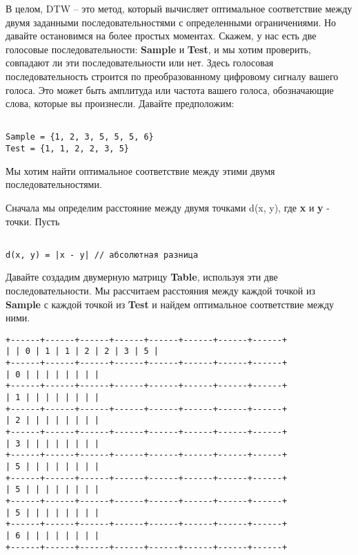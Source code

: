 \vspace{\baselineskip}
В целом, DTW – это метод, который вычисляет оптимальное соответствие между двумя заданными последовательностями с определенными ограничениями. Но давайте остановимся на более простых моментах. Скажем, у нас есть две голосовые последовательности: \textbf{Sample} и \textbf{Test}, и мы хотим проверить, совпадают ли эти последовательности или нет. Здесь голосовая последовательность строится по преобразованному цифровому сигналу вашего голоса. Это может быть амплитуда или частота вашего голоса, обозначающие слова, которые вы произнесли. Давайте предположим:


\vspace{\baselineskip}
\begin{tcolorbox}
\begin{verbatim}

Sample = {1, 2, 3, 5, 5, 5, 6}
Test = {1, 1, 2, 2, 3, 5}

\end{verbatim}
\end{tcolorbox}

\vspace{\baselineskip}
Мы хотим найти оптимальное соответствие между этими двумя последовательностями.

Сначала мы определим расстояние между двумя точками d(x, y), где \textbf{x} и \textbf{y} - точки. Пусть

\vspace{\baselineskip}
\begin{tcolorbox}
\begin{verbatim}

d(x, y) = |x - y| // абсолютная разница

\end{verbatim}
\end{tcolorbox}

\vspace{\baselineskip}
\vspace{-0.2cm}
Давайте создадим двумерную матрицу \textbf{Table}, используя эти две последовательности. Мы рассчитаем расстояния между каждой точкой из \textbf{Sample} с каждой точкой из \textbf{Test} и найдем оптимальное соответствие между ними.

\newpage
\begin{tcolorbox}
\begin{verbatim}
+------+------+------+------+------+------+------+------+
| | 0 | 1 | 1 | 2 | 2 | 3 | 5 |
+------+------+------+------+------+------+------+------+
| 0 | | | | | | | |
+------+------+------+------+------+------+------+------+
| 1 | | | | | | | |
+------+------+------+------+------+------+------+------+
| 2 | | | | | | | |
+------+------+------+------+------+------+------+------+
| 3 | | | | | | | |
+------+------+------+------+------+------+------+------+
| 5 | | | | | | | |
+------+------+------+------+------+------+------+------+
| 5 | | | | | | | |
+------+------+------+------+------+------+------+------+
| 5 | | | | | | | |
+------+------+------+------+------+------+------+------+
| 6 | | | | | | | |
+------+------+------+------+------+------+------+------+
\end{verbatim}
\end{tcolorbox}

